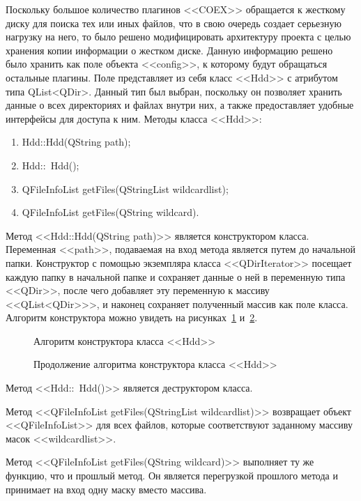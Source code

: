 Поскольку большое количество плагинов <<COEX>> обращается к жесткому диску для поиска тех или иных файлов, что в свою очередь создает серьезную нагрузку на него, то было решено модифицировать архитектуру проекта с целью хранения копии информации о жестком диске. Данную информацию решено было хранить как поле объекта <<config>>, к которому будут обращаться остальные плагины. Поле представляет из себя класс <<Hdd>> с атрибутом типа QList<QDir>. Данный тип был выбран, поскольку он позволяет хранить данные о всех директориях и файлах внутри них, а также предоставляет удобные интерфейсы для доступа к ним. Методы класса <<Hdd>>:

\begin{enumerate}
  \item Hdd::Hdd(QString path);
  \item Hdd::~Hdd();
  \item QFileInfoList getFiles(QStringList wildcardlist);
  \item QFileInfoList getFiles(QString wildcard).
\end{enumerate}

Метод <<Hdd::Hdd(QString path)>> является конструктором класса. Переменная <<path>>, подаваемая на вход метода является путем до начальной папки. Конструктор с помощью экземпляра класса <<QDirIterator>> посещает каждую папку в начальной папке и сохраняет данные о ней в переменную типа <<QDir>>, после чего добавляет эту переменную к массиву <<QList<QDir>>>, и наконец сохраняет полученный массив как поле класса. Алгоритм конструктора можно увидеть на рисунках~\ref{bok_6:bok_6} и~\ref{bok_7:bok_7}.

\begin{figure}[hb!]
\caption{ Алгоритм конструктора класса <<Hdd>> }
\label{bok_6:bok_6}
\end{figure}

\begin{figure}[!ht]
\caption{ Продолжение алгоритма конструктора класса <<Hdd>> }
\label{bok_7:bok_7}
\end{figure}

Метод <<Hdd::~Hdd()>> является деструктором класса.

Метод <<QFileInfoList getFiles(QStringList wildcardlist)>> возвращает объект <<QFileInfoList>> для всех файлов, которые соответствуют заданному массиву масок <<wildcardlist>>.

Метод <<QFileInfoList getFiles(QString wildcard)>> выполняет ту же функцию, что и прошлый метод. Он является перегрузкой прошлого метода и принимает на вход одну маску вместо массива.


